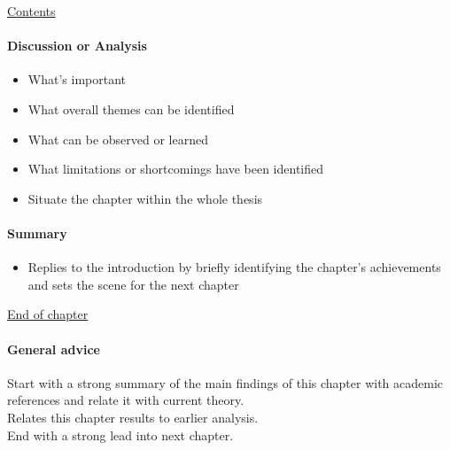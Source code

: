 \documentclass[dissertation,final]{softeng}
\begin{document}
\noindent\underline{Contents}
\paragraph{Discussion or Analysis}
\begin{itemize}
\item What's important
\item What overall themes can be identified
\item What can be observed or learned
\item What limitations or shortcomings have been identified
\item Situate the chapter within the whole thesis
\end{itemize}
\paragraph{Summary}
\begin{itemize}
\item Replies to the introduction by briefly identifying the chapter's achievements and sets the scene for the next chapter
\end{itemize}

\noindent\underline{End of chapter}
\paragraph{General advice}
Start with a strong summary of the main findings of this chapter with academic references and relate it with current theory.\\
Relates this chapter results to earlier analysis.\\
End with a strong lead into next chapter.\\

\printbibliography
\end{document}
